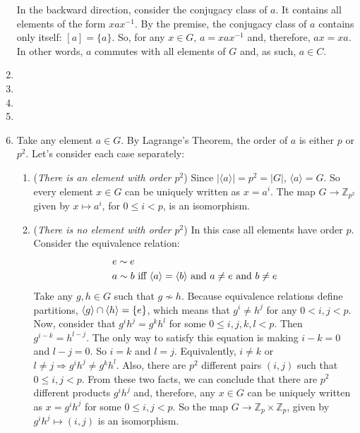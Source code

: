 \begin{enumerate}
    In the backward direction, consider the conjugacy class of $a$. It contains all elements of the form $xax^{-1}$. By the premise, the conjugacy class of $a$ contains only itself: $[a] = \{a\}$. So, for any $x \in G$, $a = xax^{-1}$ and, therefore, $ax = xa$. In other words, $a$ commutes with all elements of $G$ and, as such, $a \in C$.
    \item 
    \item 
    \item 
    \item 
    \item Take any element $a \in G$. By Lagrange's Theorem, the order of $a$ is either $p$ or $p^2$. Let's consider each case separately:
    \begin{enumerate}
        \item (\emph{There is an element with order $p^2$}) Since $|\langle a\rangle| = p^2 = |G|$, $\langle a\rangle = G$. So every element $x \in G$ can be uniquely written as $x = a^i$. The map $G \to \mathbb{Z}_{p^2}$ given by $x \mapsto a^i$, for $0 \leqslant i < p$, is an isomorphism.
        \item (\emph{There is no element with order $p^2$}) In this case all elements have order $p$. Consider the equivalence relation:
        \begin{align*} 
            e \sim e &\\ 
            a \sim b &\ \text{iff $\langle a\rangle = \langle b\rangle$ and $a \ne e$ and $b \ne e$}
        \end{align*}
        Take any $g, h \in G$ such that $g \nsim h$. Because equivalence relations define partitions, $\langle g\rangle \cap \langle h\rangle = \{e\}$, which means that $g^i \ne h^j$ for any $0 < i, j < p$. Now, consider that $g^ih^j = g^kh^l$ for some $0 \leqslant i, j, k, l < p$. Then $g^{i - k} = h^{l - j}$. The only way to satisfy this equation is making $i - k = 0$ and $l - j = 0$. So $i = k$ and $l = j$. Equivalently, $i \ne k$ or $l \ne j \Rightarrow g^ih^j \ne g^kh^l$. Also, there are $p^2$ different pairs $(i, j)$ such that $0 \leqslant i, j < p$. From these two facts, we can conclude that there are $p^2$ different products $g^ih^j$  and, therefore,  any $x \in G$ can be uniquely written as $x = g^ih^j$ for some $0 \leqslant i, j < p$. So the map $G \to \mathbb{Z}_p \times \mathbb{Z}_p$, given by $g^ih^j \mapsto (i, j)$ is an isomorphism.
    \end{enumerate}
\end{enumerate}

